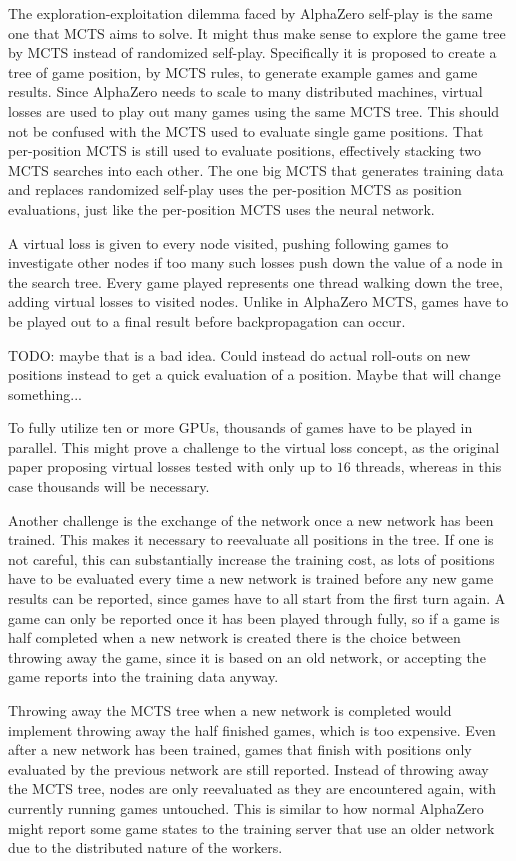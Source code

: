 \documentclass[12pt,onecolumn,oneside,titlepage]{article}
\begin{document}
The exploration-exploitation dilemma faced by AlphaZero self-play is the same one that MCTS aims to solve. It might thus make sense to explore the game tree by MCTS instead of randomized self-play.
Specifically it is proposed to create a tree of game position, by MCTS rules, to generate example games and game results. Since AlphaZero needs to scale to many distributed machines, virtual losses \cite{chaslot2008parallel} are used to play out many games 
using the same MCTS tree. This should not be confused with the MCTS used to evaluate single game positions. That per-position MCTS is still used to evaluate positions, effectively stacking two MCTS searches into each other. The one big MCTS that generates training data
and replaces randomized self-play uses the per-position MCTS as position evaluations, just like the per-position MCTS uses the neural network.

A virtual loss is given to every node visited, pushing following games to investigate other nodes if too many such losses push down the value of a node in the search tree.
Every game played represents one thread walking down the tree, adding virtual losses to visited nodes. Unlike in AlphaZero MCTS, games have to be played out to a final result before backpropagation can occur. 

TODO: maybe that is a bad idea. Could instead do actual roll-outs on new positions instead to get a quick evaluation of a position. Maybe that will change something...

To fully utilize ten or more GPUs, thousands of games have to be played in parallel. This might prove a challenge to 
the virtual loss concept, as the original paper proposing virtual losses tested with only up to $16$ threads, whereas in this case thousands will be necessary.

Another challenge is the exchange of the network once a new network has been trained. This makes it necessary to reevaluate all positions in the tree. If one is not careful, this can substantially increase the training cost,
as lots of positions have to be evaluated every time a new network is trained before any new game results can be reported, since games have to all start from the first turn again. A game can only be reported once it has been played through fully,
so if a game is half completed when a new network is created there is the choice between throwing away the game, since it is based on an old network, or accepting the game reports into the training data anyway. 

Throwing away the MCTS tree when a new network 
is completed would implement throwing away the half finished games, which is too expensive.
Even after a new network has been trained, games that finish with positions only evaluated by the previous network are still reported. Instead of throwing away the MCTS tree, nodes are only reevaluated as they are encountered again,
with currently running games untouched.
This is similar to how normal AlphaZero might report some game states to the training server that use an older network due to the distributed nature of the workers.
\end{document}
